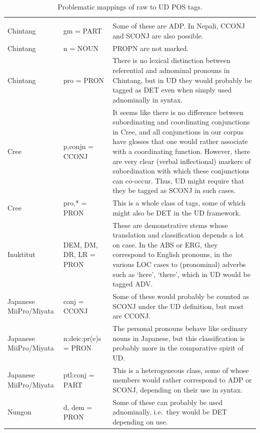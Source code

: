 \documentclass[a4paper, 11pt]{book}
\begin{document}
\begin{longtable}{lp{.2\linewidth}p{.5\linewidth}}
	\bottomrule\\[-0.15cm]
	\caption{Problematic mappings of raw to UD POS tags.}
	\endfoot
		Chintang                  & gm = PART                 & Some of these are ADP. In Nepali, CCONJ and SCONJ are also possible. \\
		Chintang                  & n = NOUN                  & PROPN are not marked. \\
		Chintang                  & pro = PRON                & There is no lexical distinction between referential and adnominal pronouns in Chintang, but in UD they would probably be tagged as DET even when simply used adnominally in syntax. \\
		Cree                      & p,conjn = CCONJ           & It seems like there is no difference between subordinating and coordinating conjunctions in Cree, and all conjunctions in our corpus have glosses that one would rather associate with a coordinating function. However, there are very clear (verbal inflectional) markers of subordination with which these conjunctions can co-occur. Thus, UD might require that they be tagged as SCONJ in such cases. \\
		Cree                      & pro,* = PRON              & This is a whole class of tags, some of which might also be DET in the UD framework. \\ 
		Inuktitut                 & DEM, DM, DR, LR = PRON    & These are demonstrative stems whose translation and classification depends a lot on case. In the ABS or ERG, they correspond to English pronouns, in the various LOC cases to (pronominal) adverbs such as `here', `there', which in UD would be tagged ADV. \\ 
		Japanese MiiPro/Miyata    & conj = CCONJ              & Some of these would probably be counted as SCONJ under the UD definition, but most are CCONJ. \\
		Japanese MiiPro/Miyata    & n:deic:pr(e)s \hspace{2cm} = PRON      & The personal pronouns behave like ordinary nouns in Japanese, but this classification is probably more in the comparative spirit of UD. \\
		Japanese MiiPro/Miyata    & ptl:conj = PART           & This is a heterogeneous class, some of whose members would rather correspond to ADP or SCONJ, depending on their use in syntax. \\
		Nungon                    & d, dem = PRON             & Some of these can probably be used adnominally, i.e.\ they would be DET depending on use. \\ 

\end{longtable}
\end{document}

